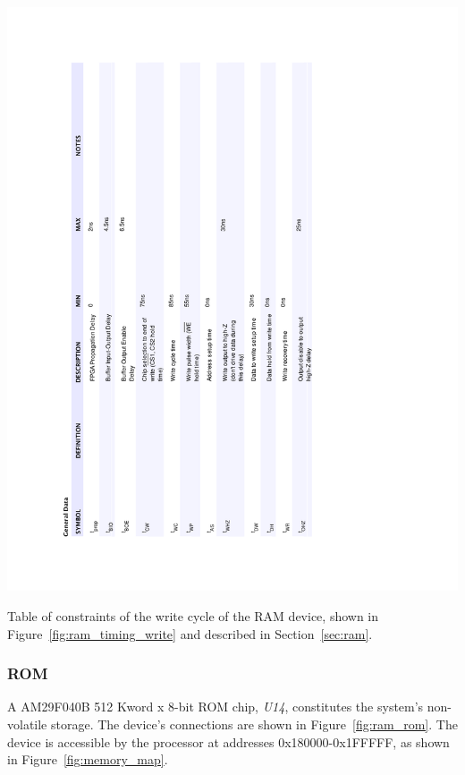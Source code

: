 \documentclass[titlepage]{scrartcl}
\begin{document}
	\clearpage

	\begin{table}[h!]
	\vspace{-2cm}
	\centerline{\includegraphics[width=20cm]{img/ram_write_table.pdf}}
		\vspace{0cm}
                	\caption{Table of constraints of the write cycle of the RAM device, shown in Figure~\ref{fig:ram_timing_write} and described in Section~\ref{sec:ram}.}
               	\label{tab:ram_timing_write}
	\end{table}

	\clearpage

	\subsubsection{ROM \label{sec:rom}}
	A AM29F040B 512 Kword x 8-bit ROM chip, \textit{U14}, constitutes the system's non-volatile storage. The device's connections are shown in Figure~\ref{fig:ram_rom}. The device is accessible by the processor at addresses 0x180000-0x1FFFFF, as shown in Figure~\ref{fig:memory_map}.\\
\end{document}
